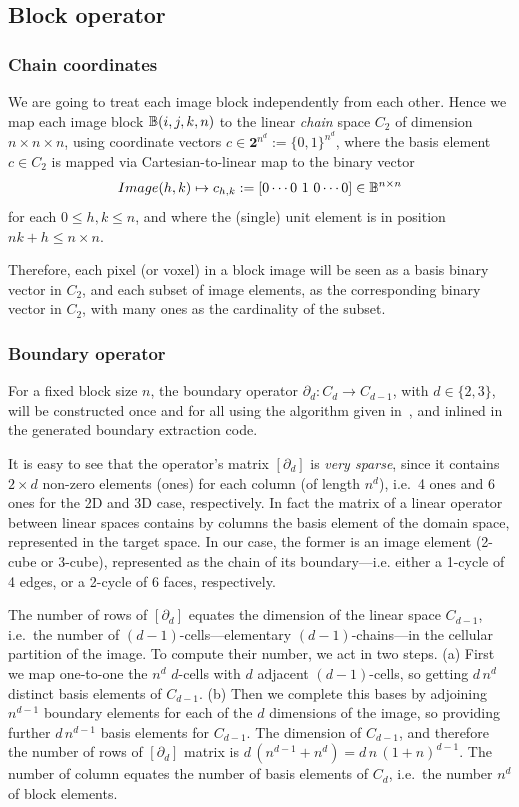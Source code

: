 \documentclass[11pt, oneside]{amsart}   	%
\begin{document}
\subsection{Block operator }\label{sec:block}

\subsubsection*{Chain coordinates }\label{sec:chain-coords}
We are going to treat each image block independently from each other. Hence we map each image block $\mathbb{B}(i,j,k,n)$ to the linear \emph{chain} space $C_2$ of dimension $n\times n\times n$, using coordinate vectors $c\in \mathbf{2}^{n^d} := \{0,1\}^{n^d}$, where the basis element $c \in C_2$ is mapped via Cartesian-to-linear map to the binary vector 
\[
Image(h,k) \mapsto c_{h,k} := [0 \cdots 0\ 1\ 0 \cdots 0] \in \mathbb{B}^{n\times n}
\]
for each $0\leq h,k \leq n$, and where the (single) unit element is in position $nk + h \leq n\times n$.

Therefore, each pixel (or voxel) in a block image will be seen as a basis binary vector in $C_2$, and each subset of image elements, as the corresponding binary vector in $C_2$, with many ones as the cardinality of the subset.

\subsubsection*{Boundary operator }\label{sec:boundary-operator}
For a fixed block size $n$, the boundary operator $\partial_d : C_d\to C_{d-1}$, with $d\in\{2,3\}$, will be constructed once and for all using the algorithm given in~\cite{}, and inlined in the generated boundary extraction code.

It is easy to see that the operator's matrix $[\partial_d]$ is \emph{very sparse}, since it contains $2\times d$ non-zero elements (ones) for each column (of length $n^d$), i.e.~4 ones and 6 ones for the 2D and 3D case, respectively. In fact the matrix of a linear operator between linear spaces contains by columns the basis element of the domain space, represented in the target space. In our case, the former is an image element (2-cube or 3-cube), represented as the chain of its boundary---i.e. either a 1-cycle of 4 edges, or  a 2-cycle of 6 faces, respectively.  

The number of rows of $[\partial_d]$ equates the dimension of the linear space $C_{d-1}$, i.e.~the number of $(d-1)$-cells---elementary $(d-1)$-chains---in the cellular partition of the image. To compute their number, we act in two steps. (a) First we map one-to-one the $n^d$ $d$-cells with $d$ adjacent $(d-1)$-cells, so getting $d\,n^d$ distinct basis elements of $C_{d-1}$. (b) Then we complete this bases by adjoining $n^{d-1}$ boundary elements for each of the $d$ dimensions of the image, so providing further $d\,n^{d-1}$ basis elements for $C_{d-1}$. The dimension of $C_{d-1}$, and therefore the number of rows of $[\partial_d]$ matrix is $d\,(n^{d-1}+n^{d}) = d\,n\,(1+n)^{d-1}$. The number of column equates the number of basis elements of $C_d$, i.e.~the number $n^d$ of block elements.
\end{document}
